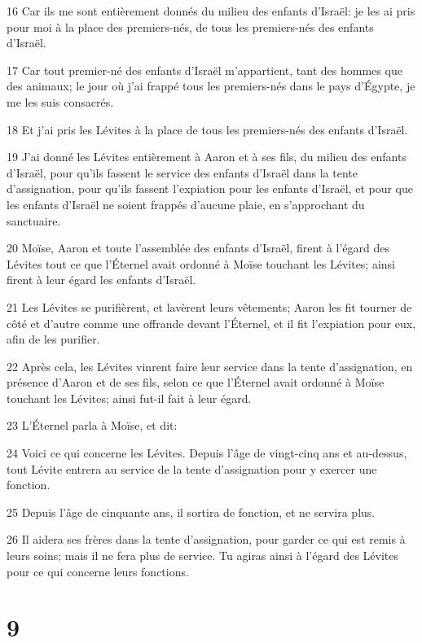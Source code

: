 \par 16 Car ils me sont entièrement donnés du milieu des enfants d'Israël: je les ai pris pour moi à la place des premiers-nés, de tous les premiers-nés des enfants d'Israël.
\par 17 Car tout premier-né des enfants d'Israël m'appartient, tant des hommes que des animaux; le jour où j'ai frappé tous les premiers-nés dans le pays d'Égypte, je me les suis consacrés.
\par 18 Et j'ai pris les Lévites à la place de tous les premiers-nés des enfants d'Israël.
\par 19 J'ai donné les Lévites entièrement à Aaron et à ses fils, du milieu des enfants d'Israël, pour qu'ils fassent le service des enfants d'Israël dans la tente d'assignation, pour qu'ils fassent l'expiation pour les enfants d'Israël, et pour que les enfants d'Israël ne soient frappés d'aucune plaie, en s'approchant du sanctuaire.
\par 20 Moïse, Aaron et toute l'assemblée des enfants d'Israël, firent à l'égard des Lévites tout ce que l'Éternel avait ordonné à Moïse touchant les Lévites; ainsi firent à leur égard les enfants d'Israël.
\par 21 Les Lévites se purifièrent, et lavèrent leurs vêtements; Aaron les fit tourner de côté et d'autre comme une offrande devant l'Éternel, et il fit l'expiation pour eux, afin de les purifier.
\par 22 Après cela, les Lévites vinrent faire leur service dans la tente d'assignation, en présence d'Aaron et de ses fils, selon ce que l'Éternel avait ordonné à Moïse touchant les Lévites; ainsi fut-il fait à leur égard.
\par 23 L'Éternel parla à Moïse, et dit:
\par 24 Voici ce qui concerne les Lévites. Depuis l'âge de vingt-cinq ans et au-dessus, tout Lévite entrera au service de la tente d'assignation pour y exercer une fonction.
\par 25 Depuis l'âge de cinquante ans, il sortira de fonction, et ne servira plus.
\par 26 Il aidera ses frères dans la tente d'assignation, pour garder ce qui est remis à leurs soins; mais il ne fera plus de service. Tu agiras ainsi à l'égard des Lévites pour ce qui concerne leurs fonctions.

\chapter{9}

